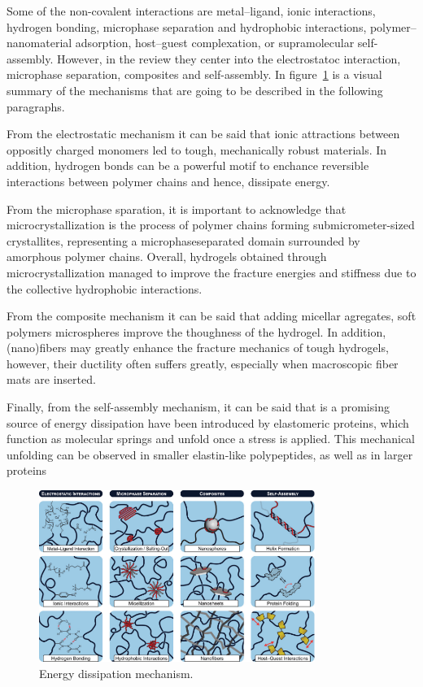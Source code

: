 Some of the non-covalent interactions are 
    metal–ligand, 
    ionic interactions, 
    hydrogen bonding, 
    microphase separation 
    and hydrophobic interactions, 
    polymer–nanomaterial adsorption, 
    host–guest complexation, 
    or supramolecular self-assembly.
However, in the review they center into the electrostatoc interaction, microphase separation, composites and self-assembly.
In figure~\ref{fig:energyDissipation} is a visual summary of the mechanisms that are going to be described in the following paragraphs.

From the electrostatic mechanism it can be said that ionic attractions between oppositly charged monomers led to tough, mechanically robust materials.
In addition, hydrogen bonds can be a powerful motif to enchance reversible interactions between polymer chains and hence, dissipate energy.

From the microphase sparation, it is important to acknowledge that microcrystallization is the process of polymer chains forming submicrometer-sized crystallites, representing a microphaseseparated domain surrounded by amorphous polymer chains.
Overall, hydrogels obtained through microcrystallization managed to improve the fracture energies and stiffness due to the collective hydrophobic interactions. 

From the composite mechanism it can be said that adding micellar agregates, soft polymers microspheres improve the thoughness of the hydrogel.
In addition, (nano)fibers may greatly enhance the fracture mechanics of tough hydrogels, however, their ductility often suffers greatly, especially when macroscopic fiber mats are inserted.

Finally, from the self-assembly mechanism, it can be said that is a promising source of energy dissipation have been introduced by elastomeric proteins, which function as molecular springs and unfold once a stress is applied. 
This mechanical unfolding can be observed in smaller elastin-like polypeptides, as well as in larger proteins

\begin{figure}[ht!]
    \centering
    \includegraphics[width=0.8\textwidth]{figs/explainMechResponse/energyDissipationMechanisms.png
}
    \caption{Energy dissipation mechanism\citep{naritaViscoelasticPropertiesPolyvinyl2013}.}\label{fig:energyDissipation}
\end{figure}


